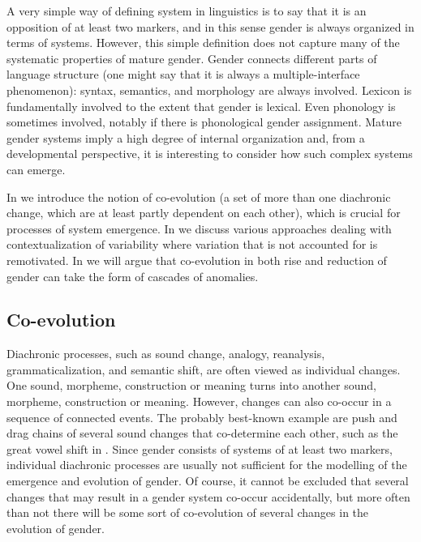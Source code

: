 \documentclass[output=collectionpaper]{langsci/langscibook}
\begin{document}
A very simple way of defining system in linguistics is to say that it is an opposition of at least two markers, and in this sense gender is always organized in terms of systems. However, this simple definition does not capture many of the systematic properties of mature gender. Gender connects different parts of language structure (one might say that it is always a multiple-interface phenomenon): syntax, semantics, and morphology are always involved. Lexicon is fundamentally involved to the extent that gender is lexical. Even phonology is sometimes involved, notably if there is phonological gender assignment. Mature gender systems imply a high degree of internal organization and, from a developmental perspective, it is interesting to consider how such complex systems can emerge.

In  we introduce the notion of co-evolution (a set of more than one diachronic change, which are at least partly dependent on each other), which is crucial for processes of system emergence. In  we discuss various approaches dealing with contextualization of variability where variation that is not accounted for is remotivated. In  we will argue that co-evolution in both rise and reduction of gender can take the form of cascades of anomalies.

  \subsection{Co-evolution}
  \label{sec:WDG:10.2}

Diachronic processes, such as sound change, analogy, reanalysis, grammaticalization, and semantic shift, are often viewed as individual changes. One sound, morpheme, construction or meaning turns into another sound, morpheme, construction or meaning. However, changes can also co-occur in a sequence of connected events. The probably best-known example are push and drag chains of several sound changes that co-determine each other, such as the great vowel shift in . Since gender consists of systems of at least two markers, individual diachronic processes are usually not sufficient for the modelling of the emergence and evolution of gender. Of course, it cannot be excluded that several changes that may result in a gender system co-occur accidentally, but more often than not there will be some sort of co-evolution of several changes in the evolution of gender.
\end{document}
